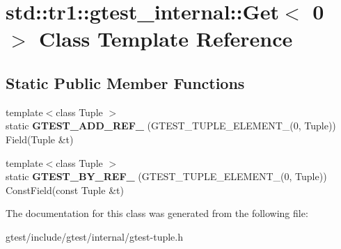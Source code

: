 \hypertarget{classstd_1_1tr1_1_1gtest__internal_1_1Get_3_010_01_4}{}\section{std\+:\+:tr1\+:\+:gtest\+\_\+internal\+:\+:Get$<$ 0 $>$ Class Template Reference}
\label{classstd_1_1tr1_1_1gtest__internal_1_1Get_3_010_01_4}
\subsection*{Static Public Member Functions}
\begin{DoxyCompactItemize}
\item 
\mbox{\label{classstd_1_1tr1_1_1gtest__internal_1_1Get_3_010_01_4_a74beca3869fddfe42ee608b7f4cacb96}} 
{\footnotesize template$<$class Tuple $>$ }\\static {\bfseries G\+T\+E\+S\+T\+\_\+\+A\+D\+D\+\_\+\+R\+E\+F\+\_\+} (G\+T\+E\+S\+T\+\_\+\+T\+U\+P\+L\+E\+\_\+\+E\+L\+E\+M\+E\+N\+T\+\_\+(0, Tuple)) Field(Tuple \&t)
\item 
\mbox{\label{classstd_1_1tr1_1_1gtest__internal_1_1Get_3_010_01_4_a195b3853de45077f9a324c455f22d7e2}} 
{\footnotesize template$<$class Tuple $>$ }\\static {\bfseries G\+T\+E\+S\+T\+\_\+\+B\+Y\+\_\+\+R\+E\+F\+\_\+} (G\+T\+E\+S\+T\+\_\+\+T\+U\+P\+L\+E\+\_\+\+E\+L\+E\+M\+E\+N\+T\+\_\+(0, Tuple)) Const\+Field(const Tuple \&t)
\end{DoxyCompactItemize}


The documentation for this class was generated from the following file\+:\begin{DoxyCompactItemize}
\item 
gtest/include/gtest/internal/gtest-\/tuple.\+h\end{DoxyCompactItemize}
